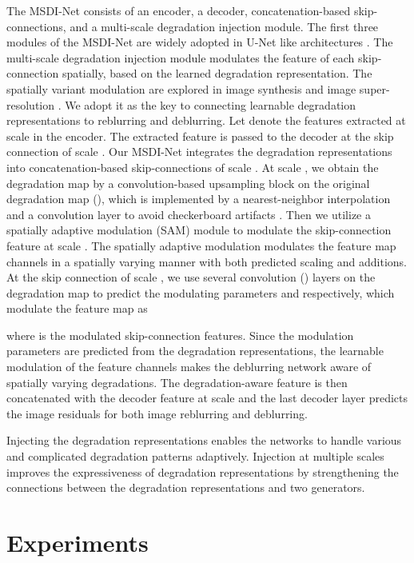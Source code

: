 \documentclass[runningheads]{llncs}
\begin{document}
The MSDI-Net consists of an encoder, a decoder, concatenation-based skip-connections, and a multi-scale degradation injection module. 
The first three modules of the MSDI-Net are widely adopted in U-Net like architectures \cite{U-Net}. The multi-scale degradation injection module modulates the feature of each skip-connection spatially, based on the learned degradation representation. The spatially variant modulation are explored in image synthesis \cite{park2019SPADE} and image super-resolution \cite{liang2021mutual}. We adopt it as the key to connecting learnable degradation representations to reblurring and deblurring. 
Let  denote the features extracted at scale  in the encoder. 
The extracted feature  is passed to the decoder at the skip connection of scale . 
Our MSDI-Net integrates the degradation representations into concatenation-based skip-connections of scale . 
At scale , we obtain the degradation map  by a convolution-based upsampling block on the original degradation map  (), which is implemented by a nearest-neighbor interpolation and a convolution layer to avoid checkerboard artifacts \cite{checkboardartifacts}. 
Then we utilize a spatially adaptive modulation (SAM) module to modulate the skip-connection feature  at scale . The spatially adaptive modulation modulates the feature map channels in a spatially varying manner with both predicted scaling and additions.
At the skip connection of scale , we use several convolution () layers on the degradation map  to predict the modulating parameters  and  respectively, which modulate the feature map  as

where  is the modulated skip-connection features. Since the modulation parameters are predicted from the degradation representations, the learnable modulation of the feature channels makes the deblurring network aware of spatially varying degradations.
The degradation-aware feature  is then concatenated with the decoder feature at scale  and the last decoder layer predicts the image residuals for both image reblurring and deblurring.

Injecting the degradation representations enables the networks to handle various and complicated degradation patterns adaptively.
Injection at multiple scales improves the expressiveness of degradation representations by strengthening the connections between the degradation representations and two generators.


\section{Experiments}
\end{document}
